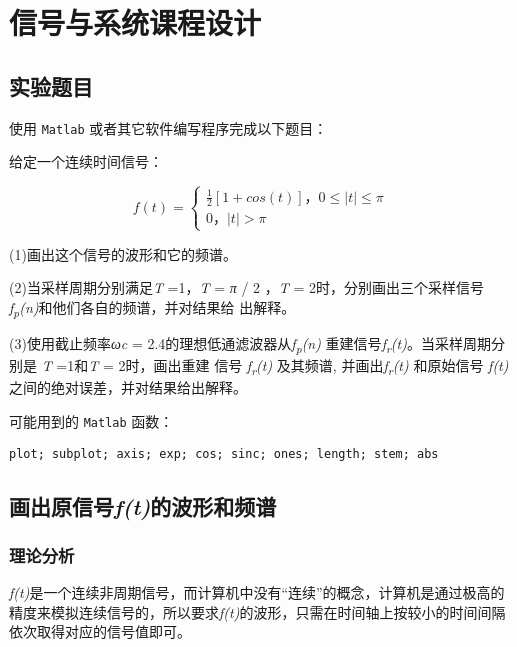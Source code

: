 \documentclass[]{article}
\date{}
\begin{document}
\hypertarget{header-n2}{%
\section{信号与系统课程设计}\label{header-n2}}

\tableofcontents

\hypertarget{header-n5}{%
\subsection{实验题目}\label{header-n5}}

使用 \texttt{Matlab} 或者其它软件编写程序完成以下题目：

给定一个连续时间信号：

\[f(t)=\begin{cases} \frac{1}{2}[1+cos(t)]，0\leq |t| \leq \pi\\ 0，|t| >  \pi \end{cases}\]

(1)画出这个信号的波形和它的频谱。

(2)当采样周期分别满足\emph{T} =1，\emph{T} = \emph{π} / 2 ，\emph{T} =
2时，分别画出三个采样信号
\emph{f\textsubscript{p}(n)}和他们各自的频谱，并对结果给 出解释。

(3)使用截止频率\emph{ωc} =
2.4的理想低通滤波器从\emph{f\textsubscript{p}(n)}
重建信号\emph{f\textsubscript{r}(t)}。当采样周期分别是 \emph{T}
=1和\emph{T} = 2时，画出重建 信号 \emph{f\textsubscript{r}(t)} 及其频谱,
并画出\emph{f\textsubscript{r}(t)} 和原始信号
\emph{f(t)}之间的绝对误差，并对结果给出解释。

可能用到的 \texttt{Matlab} 函数：

\texttt{plot;\ subplot;\ axis;\ exp;\ cos;\ sinc;\ ones;\ length;\ stem;\ abs}

\hypertarget{header-n16}{%
\subsection{\texorpdfstring{画出原信号\emph{f(t)}的波形和频谱}{画出原信号f(t)的波形和频谱}}\label{header-n16}}

\hypertarget{header-n17}{%
\subsubsection{理论分析}\label{header-n17}}

\emph{f(t)}是一个连续非周期信号，而计算机中没有``连续''的概念，计算机是通过极高的精度来模拟连续信号的，所以要求\emph{f(t)}的波形，只需在时间轴上按较小的时间间隔依次取得对应的信号值即可。
\end{document}
